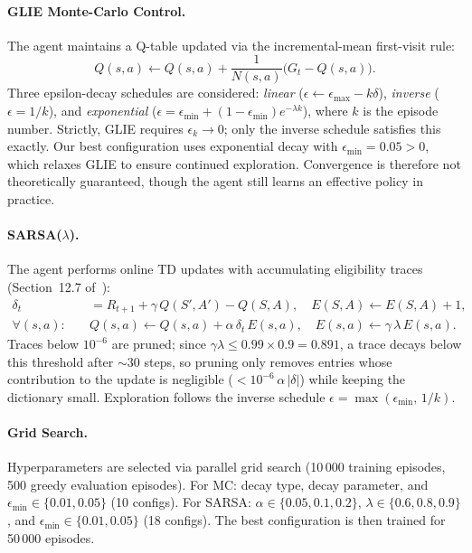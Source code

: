 \documentclass[runningheads]{llncs}
\begin{document}
\paragraph{GLIE Monte-Carlo Control.} The agent maintains a Q-table updated via the incremental-mean first-visit rule:
\begin{equation}
    Q(s,a) \leftarrow Q(s,a) + \frac{1}{N(s,a)}\bigl(G_t - Q(s,a)\bigr).
\end{equation}
Three epsilon-decay schedules are considered: \emph{linear} ($\epsilon \leftarrow \epsilon_{\max} - k\delta$), \emph{inverse} ($\epsilon = 1/k$), and \emph{exponential} ($\epsilon = \epsilon_{\min} + (1 - \epsilon_{\min})e^{-\lambda k}$), where $k$ is the episode number. Strictly, GLIE requires $\epsilon_k \to 0$; only the inverse schedule satisfies this exactly. Our best configuration uses exponential decay with $\epsilon_{\min}=0.05>0$, which relaxes GLIE to ensure continued exploration. Convergence is therefore not theoretically guaranteed, though the agent still learns an effective policy in practice.

\paragraph{SARSA($\lambda$).} The agent performs online TD updates with accumulating eligibility traces (Section~12.7 of~\cite{sutton2018}):
\begin{align}
    \delta_t &= R_{t+1} + \gamma\, Q(S',A') - Q(S,A), \quad E(S,A) \leftarrow E(S,A) + 1, \\
    \forall (s,a):\quad &Q(s,a) \leftarrow Q(s,a) + \alpha\,\delta_t\,E(s,a), \quad E(s,a) \leftarrow \gamma\,\lambda\,E(s,a).
\end{align}
Traces below $10^{-6}$ are pruned; since $\gamma\lambda\leq 0.99{\times}0.9 = 0.891$, a trace decays below this threshold after $\sim\!30$ steps, so pruning only removes entries whose contribution to the update is negligible ($<10^{-6}\,\alpha\,|\delta|$) while keeping the dictionary small. Exploration follows the inverse schedule $\epsilon = \max(\epsilon_{\min},\, 1/k)$.

\paragraph{Grid Search.} Hyperparameters are selected via parallel grid search (10\,000 training episodes, 500 greedy evaluation episodes). For MC: decay type, decay parameter, and $\epsilon_{\min} \in \{0.01, 0.05\}$ (10 configs). For SARSA: $\alpha \in \{0.05, 0.1, 0.2\}$, $\lambda \in \{0.6, 0.8, 0.9\}$, and $\epsilon_{\min} \in \{0.01, 0.05\}$ (18 configs). The best configuration is then trained for 50\,000 episodes.
\end{document}
